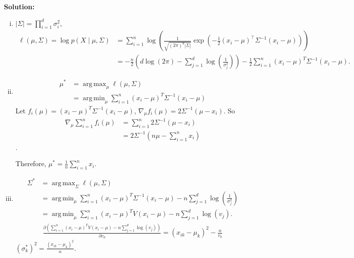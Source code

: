 \documentclass{article}
\DeclareMathOperator*{\argmax}{arg\,max}
\DeclareMathOperator*{\argmin}{arg\,min}
\newenvironment{solution}{\color{blue} \smallskip \textbf{Solution:}}{}
\begin{document}
\begin{enumerate}[(a)]
    \begin{solution}
        \begin{enumerate}[(i)]
            \item 
            $|\Sigma| = \prod_{i = 1}^{d} \sigma_i^2$, 
            \begin{align*}
                \ell(\mu, \Sigma) = \log p(X \mid \mu, \Sigma) &= \sum_{i=1}^n \log \left(
                \frac{1}{\sqrt{(2\pi)^d | \Sigma |}}
                \exp\left(
                    -\frac{1}{2} (x_i - \mu)^\top\Sigma^{-1}(x_i - \mu)
                \right)
                \right)  \\
                &=-\frac{n}{2}\left(d \log (2\pi) - \sum_{j = 1}^{d} \log\left(\frac{1}{\sigma_{j}^{2}}\right)\right) - \frac{1}{2} \sum_{i = 1}^{n}(x_{i} - \mu)^{T}\Sigma^{-1}(x_{i} - \mu).
            \end{align*}
            \item
            \begin{align*}
                \mu^{*} &= \argmax_{\mu} \ell(\mu, \Sigma) \\
                &= \argmin_{\mu}  \sum_{i = 1}^{n}(x_{i} - \mu)^{T}\Sigma^{-1}(x_{i} - \mu)
            \end{align*}
            Let $f_i(\mu) = (x_{i} - \mu)^{T}\Sigma^{-1}(x_{i} - \mu)$, $
                \nabla_\mu f_i(\mu) = 2\Sigma^{-1}(\mu - x_{i})
            $.
            So 
            \begin{align*}
                \nabla_\mu \sum_{i=1}^n f_i(\mu) &= \sum_{i=1}^n 2\Sigma^{-1}(\mu - x_{i})\\
                &= 2\Sigma^{-1}(n\mu - \sum_{i=1}^n x_{i})
            \end{align*}.

            Therefore, $\displaystyle \mu^* = \frac{1}{n}\sum_{i=1}^n x_{i}$.

            \item
            \begin{align*}
                \Sigma^{*} &= \argmax_{\Sigma} \ell(\mu, \Sigma) \\
                &= \argmin_{\mu}  \sum_{i = 1}^{n}(x_{i} - \mu)^{T}\Sigma^{-1}(x_{i} - \mu) - 
                n\sum_{j=1}^d \log\left(\frac{1}{\sigma_{j}^{2}}\right) \\
                &= \argmin_{\mu}  \sum_{i = 1}^{n}(x_{i} - \mu)^{T}V(x_{i} - \mu) - 
                n\sum_{j=1}^d \log\left(v_{j}\right).
            \end{align*}
            \begin{align*}
                \frac{\partial \left( 
                    \sum_{i = 1}^{n}(x_{i} - \mu)^{T}V(x_{i} - \mu) - 
                n\sum_{j=1}^d \log\left(v_{j}\right)
                \right)}
                {\partial v_k} = (x_{ik} - \mu_k)^2 - \frac{n}{v_k}
            \end{align*}
            $\displaystyle (\sigma^*_k)^2 = \frac{(x_{ik} - \mu_k)^2}{n}$.
            

\end{enumerate}
\end{solution}
\end{enumerate}
\end{document}

